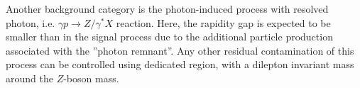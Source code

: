 Another background category is the photon-induced process with resolved photon, i.e. 
$\gamma p\rightarrow Z/\gamma^*X$ reaction.
Here, the rapidity gap is expected to be smaller than in the signal process due to the additional particle production associated with the ''photon remnant''.
Any other residual contamination of this process can be controlled using dedicated region, with a dilepton invariant mass around the $Z$-boson mass.




